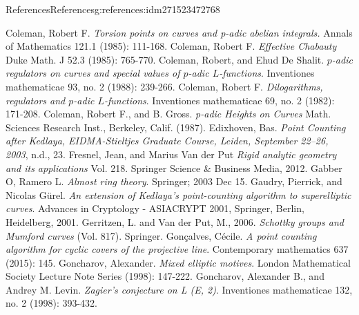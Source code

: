 \documentclass[oneside,10pt,]{book}
\numberwithin{equation}{section}
\begin{document}
\begin{references-chapter-numberless}{References}{}{References}{}{}{g:references:idm271523472768}
\begin{thebibliography}{9}
\hypertarget{x:biblio:bib-coleman-torsion}{}Coleman, Robert F.  \textit{Torsion points on curves and p-adic abelian integrals.} Annals of Mathematics 121.1 (1985): 111-168.
\hypertarget{x:biblio:bib-coleman-chabauty}{}Coleman, Robert F.  \textit{Effective Chabauty} Duke Math. J 52.3 (1985): 765-770.
\hypertarget{x:biblio:bib-coleman-de-shalit}{}Coleman, Robert, and Ehud De Shalit. \textit{\(p\)-adic regulators on curves and special values of \(p\)-adic \(L\)-functions}. Inventiones mathematicae 93, no. 2 (1988): 239-266.
\hypertarget{x:biblio:bib-coleman-dilogs}{}Coleman, Robert F. \textit{Dilogarithms, regulators and \(p\)-adic \(L\)-functions}. Inventiones mathematicae 69, no. 2 (1982): 171-208.
\hypertarget{x:biblio:bib-coleman-gross}{}Coleman, Robert F., and B. Gross. \textit{p-adic Heights on Curves} Math. Sciences Research Inst., Berkeley, Calif. (1987).
\hypertarget{x:biblio:bib-edixhoven-after}{}Edixhoven, Bas. \textit{Point Counting after Kedlaya, EIDMA-Stieltjes Graduate Course, Leiden, September 22–26, 2003}, n.d., 23.
\hypertarget{x:biblio:bib-fresnel-van-der-put}{}Fresnel, Jean, and Marius Van der Put \textit{Rigid analytic geometry and its applications} Vol. 218. Springer Science \& Business Media, 2012.
\hypertarget{x:biblio:bib-gabber-ramero}{}Gabber O, Ramero L. \textit{Almost ring theory}. Springer; 2003 Dec 15.
\hypertarget{x:biblio:bib-gaudry-gurel}{}Gaudry, Pierrick, and Nicolas Gürel. \textit{An extension of Kedlaya's point-counting algorithm to superelliptic curves}. Advances in Cryptology - ASIACRYPT 2001, Springer, Berlin, Heidelberg, 2001.
\hypertarget{x:biblio:bib-gerritzen-van-der-put}{}Gerritzen, L. and Van der Put, M., 2006. \textit{Schottky groups and Mumford curves} (Vol. 817). Springer.
\hypertarget{x:biblio:bib-goncalves}{}Gonçalves, Cécile. \textit{A point counting algorithm for cyclic covers of the projective line}. Contemporary mathematics 637 (2015): 145.
\hypertarget{x:biblio:bib-goncharov-mixed}{}Goncharov, Alexander. \textit{Mixed elliptic motives}. London Mathematical Society Lecture Note Series (1998): 147-222.
\hypertarget{x:biblio:bib-gl}{}Goncharov, Alexander B., and Andrey M. Levin. \textit{Zagier's conjecture on L (E, 2)}. Inventiones mathematicae 132, no. 2 (1998): 393-432.

\end{thebibliography}
\end{references-chapter-numberless}
\end{document}
